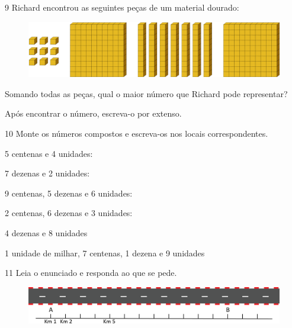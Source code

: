 \pagebreak

\num{9} Richard encontrou as seguintes peças de um material dourado:

\begin{figure}[htpb!]
\includegraphics[width=\textwidth]{./media/image4.png}
\end{figure}

Somando todas as peças, qual o maior número que Richard pode representar? 

Após encontrar o número, escreva-o por extenso.

\num{10} Monte os números compostos e escreva-os nos locais correspondentes.

\begin{escolha}
\item 5 centenas e 4 unidades:

\item 7 dezenas e 2 unidades:

\item 9 centenas, 5 dezenas e 6 unidades:

\item 2 centenas, 6 dezenas e 3 unidades:

\item 4 dezenas e 8 unidades

\item 1 unidade de milhar, 7 centenas, 1 dezena e 9 unidades

\end{escolha}


\num{11} Leia o enunciado e responda ao que se pede. 

\vspace{1em}

\begin{figure}[htpb!]
\centering
\includegraphics[width=\textwidth]{./media/image6.png}
\end{figure}

